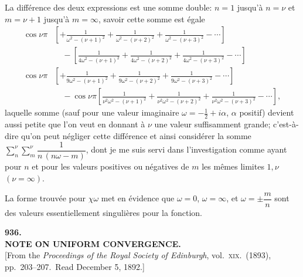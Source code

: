 \documentclass[11pt]{article}
\begin{document}
La diff\'erence des deux expressions est une somme double: $n = 1$ jusqu'\`a $n = \nu$ et $m = \nu + 1$ jusqu'\`a $m = \infty$, savoir cette somme est \'egale
\begin{align*}
\cos\nu\pi\!&\left[+\frac{1}{\omega^2 - (\nu + 1)^2} + \frac{1}{\omega^2 - (\nu + 2)^2} + \frac{1}{\omega^2 - (\nu + 3)^2} - \cdots\right] \\
   &\quad - \!\left[\frac{1}{4\omega^2 - (\nu + 1)^2} + \frac{1}{4\omega^2 - (\nu + 2)^2} + \frac{1}{4\omega^2 - (\nu + 3)^2} - \cdots\right] \\
\cos\nu\pi\!&\left[+\frac{1}{9\omega^2 - (\nu + 1)^2} + \frac{1}{9\omega^2 - (\nu + 2)^2} + \frac{1}{9\omega^2 - (\nu + 3)^2} - \cdots\right] \\
   &\quad - \cos\nu\pi\!\left[\frac{1}{\nu^2\omega^2 - (\nu + 1)^2} + \frac{1}{\nu^2\omega^2 - (\nu + 2)^2} + \frac{1}{\nu^2\omega^2 - (\nu + 3)^2} - \cdots\right],
\end{align*}
laquelle somme (sauf pour une valeur imaginaire $\omega = -\tfrac{1}{2} + i\alpha$, $\alpha$ positif) devient aussi petite que l'on veut en donnant \`a $\nu$ une valeur suffisamment grande; c'est-\`a-dire qu'on peut n\'egliger cette diff\'erence et ainsi consid\'erer la somme $\sum_n^{\nu}\sum_m^{\nu}\dfrac{1}{n\,(n\omega - m)}$, dont je me suis servi dans l'investigation comme ayant pour $n$ et pour les valeurs positives ou n\'egatives de $m$ les m\^emes limites $1, \nu$ $(\nu = \infty)$.

La forme trouv\'ee pour $\chi\omega$ met en \'evidence que $\omega = 0$, $\omega = \infty$, et $\omega = \pm\dfrac{m}{n}$ sont des valeurs essentiellement singuli\`eres pour la fonction.

\clearpage
\begin{center}
{\large\bfseries 936.}\\[0.5em]
{\large\bfseries NOTE ON UNIFORM CONVERGENCE.}\\[0.5em]
{\small [From the \textit{Proceedings of the Royal Society of Edinburgh}, vol.\ \textsc{xix}.\ (1893), pp.\ 203--207.\ Read December 5, 1892.]}
\end{center}
\vspace{0.5em}
\end{document}

